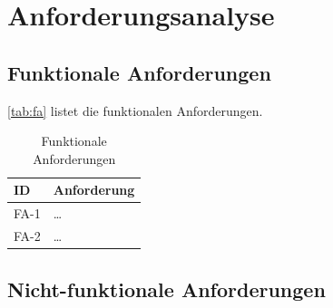 \chapter{Anforderungsanalyse}
\label{cha:anforderungen}

\section{Funktionale Anforderungen}
\label{sec:fa}

\autoref{tab:fa} listet die funktionalen Anforderungen.

\begin{table}[H]
    \centering
    \begin{tabular}{p{1.4cm}p{12cm}}
        \hline
        \textbf{ID} & \textbf{Anforderung} \\
        \hline
        FA-1 & \dots \\
        FA-2 & \dots \\
        \hline
    \end{tabular}
    \caption{Funktionale Anforderungen}
    \label{tab:fa}
\end{table}

\section{Nicht-funktionale Anforderungen}
\label{sec:nfa}
